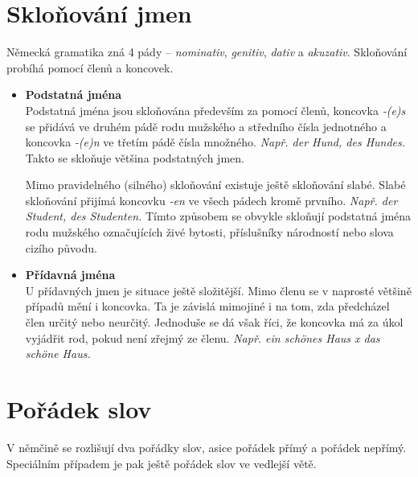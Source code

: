 \documentclass[12pt,a4paper]{report}
\begin{document}
\section{Skloňování jmen}
Německá gramatika zná 4 pády -- \textit{nominativ}, \textit{genitiv}, \textit{dativ} a \textit{akuzativ}. Skloňování probíhá pomocí členů a koncovek. 
\begin{itemize}
\item
\textbf{Podstatná jména}\\
Podstatná jména jsou skloňována především za pomocí členů, koncovka \textit{-(e)s} se přidává ve druhém pádě rodu mužského a středního čísla jednotného a koncovka \textit{-(e)n} ve třetím pádě čísla množného. \textit{Např. der Hund, des Hundes.} Takto se skloňuje většina podstatných jmen.

Mimo pravidelného (silného) skloňování existuje ještě skloňování slabé. Slabé skloňování přijímá koncovku \textit{-en} ve všech pádech kromě prvního. \textit{Např. der Student, des Studenten.} Tímto způsobem se obvykle skloňují podstatná jména rodu mužského označujících živé bytosti, příslušníky národností nebo slova cizího původu.

\item
\textbf{Přídavná jména}\\
U přídavných jmen je situace ještě složitější. Mimo členu se v naprosté většině případů mění i koncovka. Ta je závislá mimojiné i na tom, zda předcházel člen určitý nebo neurčitý. Jednoduše se dá však říci, že koncovka má za úkol vyjádřit rod, pokud není zřejmý ze členu. \textit{Např. ein schönes Haus x das schöne Haus.}
\end{itemize}

\section{Pořádek slov}
V němčině se rozlišují dva pořádky slov, asice pořádek přímý a pořádek nepřímý. Speciálním případem je pak ještě pořádek slov ve vedlejší větě.
\end{document}
